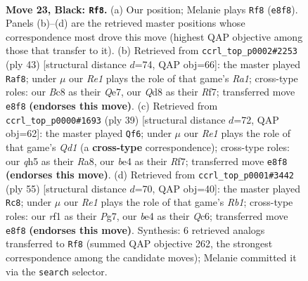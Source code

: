 \documentclass[11pt]{article}
\begin{document}
\clearpage

\begin{figure}[p]\centering
\begin{subfigure}{0.46\textwidth}\centering
\resizebox{\linewidth}{!}{%
\newchessgame
\chessboard[
  setfen={2bqr1k1/p3pp2/P2p1b2/2p2P1Q/2P1BB2/6P1/1r2N2K/R4R2 b - - 1 23},
  showmover=false,
  pgfstyle=straightmove, color=movearrow, markmove={e8-f8}
]}
\caption{}
\end{subfigure}\hfill
\begin{subfigure}{0.46\textwidth}\centering
\resizebox{\linewidth}{!}{%
\newchessgame
\chessboard[
  setfen={r5k1/1bp1qrp1/p2b4/1p6/3BP3/1PN2p2/1PP2Q2/1K1R3R b - - 0 22},
  showmover=false,
  pgfstyle=straightmove, color=movearrow, markmove={a8-f8}
]}
\caption{}
\end{subfigure}
\\[4pt]
\begin{subfigure}{0.46\textwidth}\centering
\resizebox{\linewidth}{!}{%
\newchessgame
\chessboard[
  setfen={r2q2k1/1bpn1rb1/1p4pp/1P6/P1NpP1Q1/B2B4/5PP1/R3R1K1 b - - 2 20},
  showmover=false,
  pgfstyle=straightmove, color=movearrow, markmove={d8-f6}
]}
\caption{}
\end{subfigure}\hfill
\begin{subfigure}{0.46\textwidth}\centering
\resizebox{\linewidth}{!}{%
\newchessgame
\chessboard[
  setfen={rr4k1/6p1/p1q2p1p/B1bb1P2/8/pPQB4/2P3PP/1K1RR3 b - - 3 28},
  showmover=false,
  pgfstyle=straightmove, color=movearrow, markmove={b8-c8}
]}
\caption{}
\end{subfigure}
\caption{\textbf{Move 23, Black: \texttt{Rf8}.} (a) Our position; Melanie plays \texttt{Rf8} (\texttt{e8f8}). Panels (b)--(d) are the retrieved master positions whose correspondence most drove this move (highest QAP objective among those that transfer to it). (b) Retrieved from \texttt{ccrl\_top\_p0002\#2253} (ply 43) [structural distance $d$=74, QAP obj=66]: the master played \texttt{Raf8}; under $\mu$ our \emph{Re1} plays the role of that game's \emph{Ra1}; cross-type roles: our \emph{B}c8 as their \emph{Q}e7, our \emph{Q}d8 as their \emph{R}f7; transferred move \texttt{e8f8} \textbf{(endorses this move)}. (c) Retrieved from \texttt{ccrl\_top\_p0000\#1693} (ply 39) [structural distance $d$=72, QAP obj=62]: the master played \texttt{Qf6}; under $\mu$ our \emph{Re1} plays the role of that game's \emph{Qd1} (a \textbf{cross-type} correspondence); cross-type roles: our \emph{q}h5 as their \emph{R}a8, our \emph{b}e4 as their \emph{R}f7; transferred move \texttt{e8f8} \textbf{(endorses this move)}. (d) Retrieved from \texttt{ccrl\_top\_p0001\#3442} (ply 55) [structural distance $d$=70, QAP obj=40]: the master played \texttt{Rc8}; under $\mu$ our \emph{Re1} plays the role of that game's \emph{Rb1}; cross-type roles: our \emph{r}f1 as their \emph{P}g7, our \emph{b}e4 as their \emph{Q}c6; transferred move \texttt{e8f8} \textbf{(endorses this move)}. Synthesis: 6 retrieved analogs transferred to \texttt{Rf8} (summed QAP objective 262, the strongest correspondence among the candidate moves); Melanie committed it via the \texttt{search} selector.}
\label{fig:thought-m45}
\end{figure}
\end{document}
